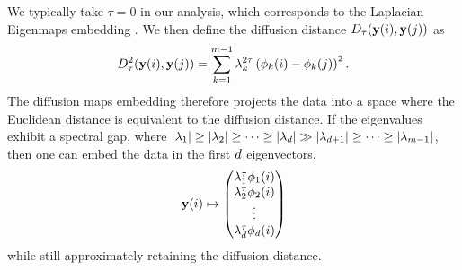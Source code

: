 %
We typically take $\tau=0$ in our analysis, which corresponds to the Laplacian Eigenmaps embedding \cite{Belkin2003}.  
%
We then define the diffusion distance $D_\tau (\mathbf{y}(i), \mathbf{y}(j))$ as 
\begin{equation}
D_\tau^2 (\mathbf{y}(i), \mathbf{y}(j)) = \sum_{k=1}^{m-1} \lambda_k^{2\tau} \left( \phi_k(i)- \phi_k(j) \right)^2.
\end{equation}
%
The diffusion maps embedding therefore projects the data into a space where the Euclidean distance is equivalent to the diffusion distance. 
%
If the eigenvalues exhibit a spectral gap, where $|\lambda_1| \ge |\lambda_2| \ge \dots \ge |\lambda_d | \gg |\lambda_{d+1} | \ge \dots \ge |\lambda_{m-1}|$, then one can embed the data in the first $d$ eigenvectors, 
\begin{equation} \label{eq:dmaps_embed_reduced}
\mathbf{y}(i) \mapsto 
\begin{pmatrix}
\lambda_1^\tau \phi_1(i) \\
\lambda_2^\tau \phi_2(i) \\
\vdots \\
\lambda_{d}^\tau  \phi_{d}(i)
\end{pmatrix}
\end{equation}
%
while still approximately retaining the diffusion distance. 






